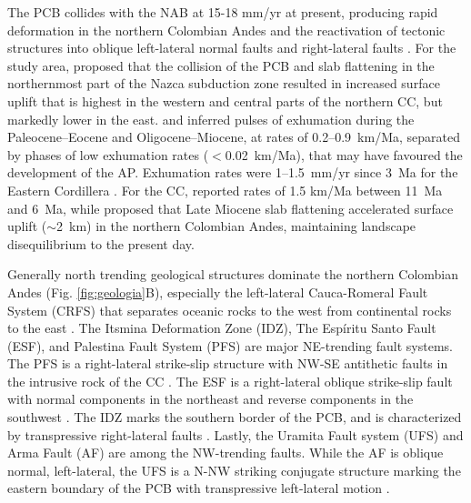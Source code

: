 \documentclass[draft]{agujournal2019}
\begin{document}
\par The PCB collides with the NAB at 15-18 mm/yr at present, producing rapid deformation in the northern Colombian Andes \cite{kellogg2019} and the reactivation of tectonic structures into oblique left-lateral normal faults and right-lateral faults \cite{acosta2007}. For the study area,  proposed that the collision of the PCB and slab flattening in the northernmost part of the Nazca subduction zone resulted in increased surface uplift that is highest in the western and central parts of the northern CC, but markedly lower in the east.  and  inferred pulses of exhumation during the Paleocene–Eocene and Oligocene–Miocene, at rates of 0.2–0.9~km/Ma, separated by phases of low exhumation rates ($<$0.02~km/Ma), that may have favoured the development of the AP. Exhumation rates were 1–1.5~mm/yr since 3~Ma for the Eastern Cordillera \cite{mora2010}. For the CC,  reported rates of 1.5 km/Ma between 11~Ma and 6~Ma, while  proposed that Late Miocene slab ﬂattening accelerated surface uplift ($\sim$2~km) in the northern Colombian Andes, maintaining landscape disequilibrium to the present day.

\par Generally north trending geological structures dominate the northern Colombian Andes (Fig. \ref{fig:geologia}B), especially the left-lateral Cauca-Romeral Fault System (CRFS) that separates oceanic rocks to the west from continental rocks to the east \cite{Egholm2013, ego1995}. The Itsmina Deformation Zone (IDZ), The Espíritu Santo Fault (ESF), and Palestina Fault System (PFS) are major NE-trending fault systems. The PFS is a right-lateral strike-slip structure with NW-SE antithetic faults in the intrusive rock of the CC \cite{acosta2007, feininger1970}. The ESF is a right-lateral oblique strike-slip fault with normal components in the northeast and reverse components in the southwest \cite{Noriega2020, page1986}. The IDZ marks the southern border of the PCB, and is characterized by transpressive right-lateral faults \cite{acosta2007, Taboada2000}. Lastly, the Uramita Fault system (UFS) and Arma Fault (AF) are among the NW-trending faults. While the AF is oblique normal, left-lateral, the UFS is a N-NW striking conjugate structure marking the eastern boundary of the PCB with transpressive left-lateral motion \cite{acosta2007, Taboada2000}.
\end{document}
